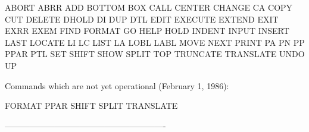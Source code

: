       ABORT     ABRR      ADD
      BOTTOM    BOX
      CALL      CENTER    CHANGE    CA        COPY      CUT
      DELETE    DHOLD     DI        DUP       DTL
      EDIT      EXECUTE   EXTEND    EXIT      EXRR      EXEM
      FIND      FORMAT
      GO
      HELP      HOLD
      INDENT    INPUT     INSERT
      LAST      LOCATE    LI        LC        LIST
                LA        LOBL     LABL
      MOVE
      NEXT
      PRINT     PA        PN        PP        PPAR      PTL
      SET       SHIFT     SHOW      SPLIT
      TOP       TRUNCATE  TRANSLATE
      UNDO      UP
 
   Commands which are not yet operational (February 1, 1986):
 
      FORMAT
      PPAR
      SHIFT
      SPLIT
      TRANSLATE
 
 
 
----------------------------------------------------------
